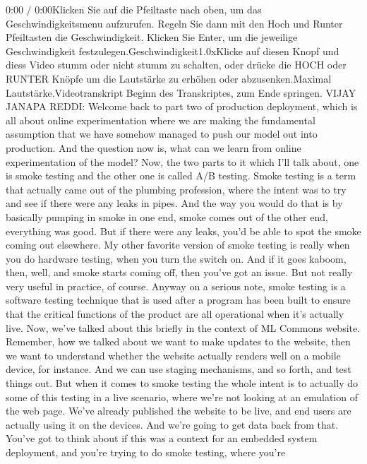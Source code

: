 {{{{    0:00 / 0:00Klicken Sie auf die Pfeiltaste nach oben, um das Geschwindigkeitsmenu aufzurufen. Regeln Sie dann mit den Hoch und Runter Pfeiltasten die Geschwindigkeit. Klicken Sie Enter, um die jeweilige Geschwindigkeit festzulegen.Geschwindigkeit1.0xKlicke auf diesen Knopf und diess Video stumm oder nicht stumm zu schalten, oder drücke die HOCH oder RUNTER Knöpfe um die Lautstärke zu erhöhen oder abzusenken.Maximal Lautstärke.Videotranskript
    Beginn des Transkriptes, zum Ende springen.
    VIJAY JANAPA REDDI: Welcome back to part two of production deployment,
    which is all about online experimentation where
    we are making the fundamental assumption that we have somehow managed
    to push our model out into production.
    And the question now is, what can we learn from online experimentation
    of the model?
    Now, the two parts to it which I'll talk about, one
    is smoke testing and the other one is called A/B testing.
    Smoke testing is a term that actually came out of the plumbing profession,
    where the intent was to try and see if there were any leaks in pipes.
    And the way you would do that is by basically pumping in smoke in one end,
    smoke comes out of the other end, everything was good.
    But if there were any leaks, you'd be able to spot the smoke coming out
    elsewhere.
    My other favorite version of smoke testing
    is really when you do hardware testing, when you turn the switch on.
    And if it goes kaboom, then, well, and smoke starts coming off,
    then you've got an issue.
    But not really very useful in practice, of course.
    Anyway on a serious note, smoke testing is a software testing technique
    that is used after a program has been built
    to ensure that the critical functions of the product
    are all operational when it's actually live.
    Now, we've talked about this briefly in the context of ML Commons website.
    Remember, how we talked about we want to make updates to the website,
    then we want to understand whether the website actually renders well
    on a mobile device, for instance.
    And we can use staging mechanisms, and so forth, and test things out.
    But when it comes to smoke testing the whole intent
    is to actually do some of this testing in a live scenario, where we're not
    looking at an emulation of the web page.
    We've already published the website to be live,
    and end users are actually using it on the devices.
    And we're going to get data back from that.
    You've got to think about if this was a context for an embedded system
    deployment, and you're trying to do smoke testing, where you're
}}}}

